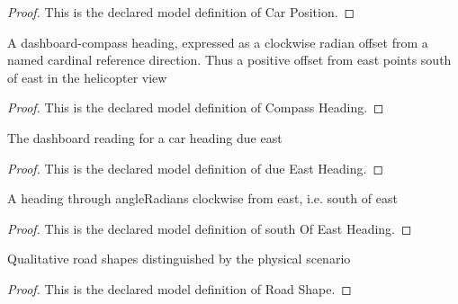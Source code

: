 \begin{proof}
  This is the declared model definition of Car Position.
\end{proof}
\begin{definition}
  \label{def:physics:phyx-mini-0667:phyxminiproblems-problemphyxmini0667-compassheading}
  A dashboard-compass heading, expressed as a clockwise radian offset from a named cardinal reference direction. Thus a positive offset from east points south of east in the helicopter view
\end{definition}
\begin{proof}
  This is the declared model definition of Compass Heading.
\end{proof}
\begin{definition}
  \label{def:physics:phyx-mini-0667:phyxminiproblems-problemphyxmini0667-dueeastheading}
  The dashboard reading for a car heading due east
\end{definition}
\begin{proof}
  This is the declared model definition of due East Heading.
\end{proof}
\begin{definition}
  \label{def:physics:phyx-mini-0667:phyxminiproblems-problemphyxmini0667-southofeastheading}
  A heading through angleRadians clockwise from east, i.e. south of east
\end{definition}
\begin{proof}
  This is the declared model definition of south Of East Heading.
\end{proof}
\begin{definition}
  \label{def:physics:phyx-mini-0667:phyxminiproblems-problemphyxmini0667-roadshape}
  Qualitative road shapes distinguished by the physical scenario
\end{definition}
\begin{proof}
  This is the declared model definition of Road Shape.
\end{proof}
